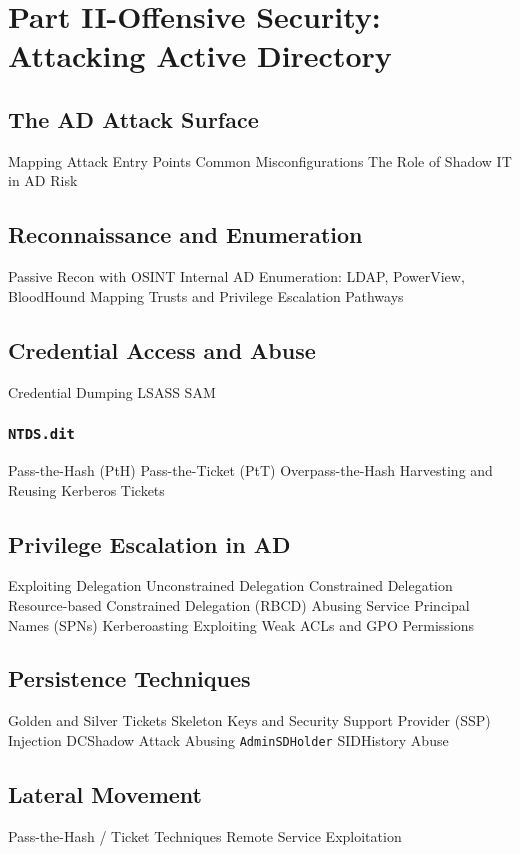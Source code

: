 \documentclass{article}
\begin{document}
\section{Part II-Offensive Security: Attacking Active Directory}

\subsection{The AD Attack Surface}
Mapping Attack Entry Points
Common Misconfigurations
The Role of Shadow IT in AD Risk

\subsection{Reconnaissance and Enumeration}
Passive Recon with OSINT
Internal AD Enumeration:
LDAP, PowerView, BloodHound
Mapping Trusts and Privilege Escalation Pathways

\subsection{Credential Access and Abuse}
Credential Dumping
LSASS
SAM
\subsubsection{\texttt{NTDS.dit}}
Pass-the-Hash (PtH)
Pass-the-Ticket (PtT)
Overpass-the-Hash
Harvesting and Reusing Kerberos Tickets

\subsection{Privilege Escalation in AD}
Exploiting Delegation
Unconstrained Delegation
Constrained Delegation
Resource-based Constrained Delegation (RBCD)
Abusing Service Principal Names (SPNs)
Kerberoasting
Exploiting Weak ACLs and GPO Permissions

\subsection{Persistence Techniques}
Golden and Silver Tickets
Skeleton Keys and Security Support Provider (SSP) Injection
DCShadow Attack
Abusing \texttt{AdminSDHolder}
SIDHistory Abuse

\subsection{Lateral Movement}
Pass-the-Hash / Ticket Techniques
Remote Service Exploitation
\end{document}
